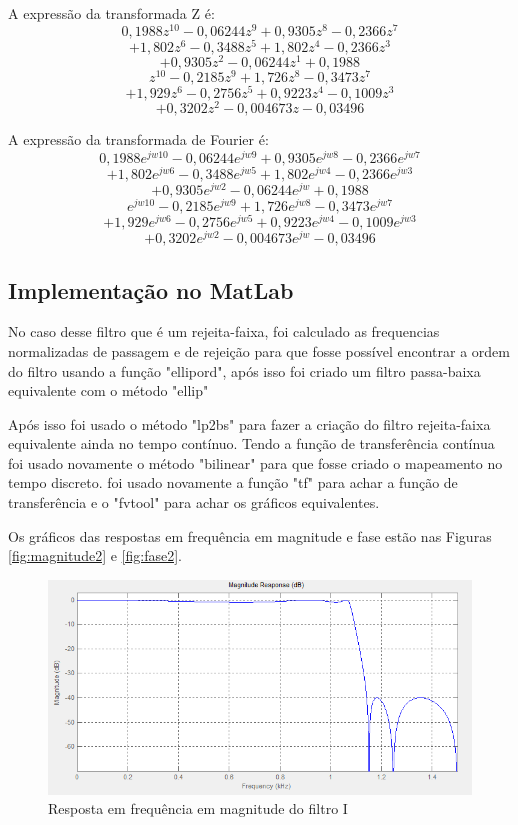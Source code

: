 \documentclass[a4paper,10pt]{article}
\begin{document}
A expressão da transformada Z é:
\[  0,1988z^{10} 	- 0,06244z^9 		+ 0,9305z^8 		- 0,2366z^7\]
\[+  1,802z^6 		- 0,3488z^5 		+ 1,802z^4 		- 0,2366z^3\]
\[+ 0,9305z^2 		- 0,06244z^1 		+ 0,1988			   \]
\hline
\[        z^{10} 		- 0,2185z^9 		+ 1,726z^8 		- 0,3473z^7\]
\[+  1,929z^6 		- 0,2756z^5 		+ 0,9223z^4 		- 0,1009z^3\]
\[+ 0,3202z^2		- 0,004673z 		- 0,03496			   \]

A expressão da transformada de Fourier é:
\[  0,1988e^{jw10} 	- 0,06244e^{jw9} 	+ 0,9305e^{jw8} 	- 0,2366e^{jw7}\]
\[+  1,802e^{jw6} 	- 0,3488e^{jw5} 	+ 1,802e^{jw4} 		- 0,2366e^{jw3}\]
\[+ 0,9305e^{jw2} 	- 0,06244e^{jw} 	+ 0,1988  			       \]
\hline
\[        e^{jw10} 	- 0,2185e^{jw9} 	+ 1,726e^{jw8} 		- 0,3473e^{jw7}\]
\[+  1,929e^{jw6} 	- 0,2756e^{jw5} 	+ 0,9223e^{jw4} 	- 0,1009e^{jw3}\]
\[+ 0,3202e^{jw2} 	- 0,004673e^{jw} 	- 0,03496			       \]

\subsection{Implementação no MatLab}
No caso desse filtro que é um rejeita-faixa, foi calculado as frequencias normalizadas de passagem e de rejeição para que
fosse possível encontrar a ordem do filtro usando a função "ellipord", após isso foi criado um filtro passa-baixa equivalente com o método "ellip"

Após isso foi usado o método "lp2bs" para fazer a criação do filtro rejeita-faixa equivalente ainda no tempo contínuo. Tendo
a função de transferência contínua foi usado novamente o método "bilinear" para que fosse criado o mapeamento no tempo discreto.
foi usado novamente a função "tf" para achar a função de transferência e o "fvtool" para achar os gráficos equivalentes.

Os gráficos das respostas em frequência em magnitude e fase estão nas Figuras \ref{fig:magnitude2} e \ref{fig:fase2}.

\begin{figure}[ht]
 \centering
 \includegraphics[width=12cm]{pictures/Filtro1/Magnitude.png}
 \caption{Resposta em frequência em magnitude do filtro I}
 \label{fig:magnitude1}
\end{figure}
\end{document}
